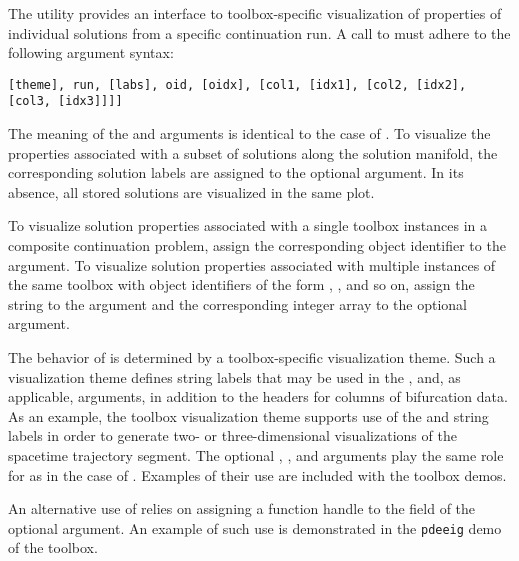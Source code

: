 The utility  provides an interface to toolbox-specific visualization of properties of individual solutions from a specific continuation run. A call to  must adhere to the following argument syntax:
\begin{lstlisting}[language=coco-highlight]
[theme], run, [labs], oid, [oidx], [col1, [idx1], [col2, [idx2], [col3, [idx3]]]]
\end{lstlisting}
The meaning of the  and  arguments is identical to the case of . To visualize the properties associated with a subset of solutions along the solution manifold, the corresponding solution labels are assigned to the optional  argument. In its absence, all stored solutions are visualized in the same plot.

To visualize solution properties associated with a single toolbox instances in a composite continuation problem, assign the corresponding object identifier to the  argument. To visualize solution properties associated with multiple instances of the same toolbox with object identifiers of the form , , and so on, assign the string  to the  argument and the corresponding integer array to the optional  argument.

The behavior of  is determined by a toolbox-specific visualization theme. Such a visualization theme defines string labels that may be used in the ,  and, as applicable,  arguments, in addition to the headers for columns of bifurcation data. As an example, the  toolbox visualization theme supports use of the  and  string labels in order to generate two- or three-dimensional visualizations of the spacetime trajectory segment. The optional , , and  arguments play the same role for  as in the case of . Examples of their use are included with the toolbox demos.

An alternative use of  relies on assigning a function handle to the  field of the optional  argument. An example of such use is demonstrated in the \texttt{pdeeig} demo of the  toolbox. \\
\medskip

